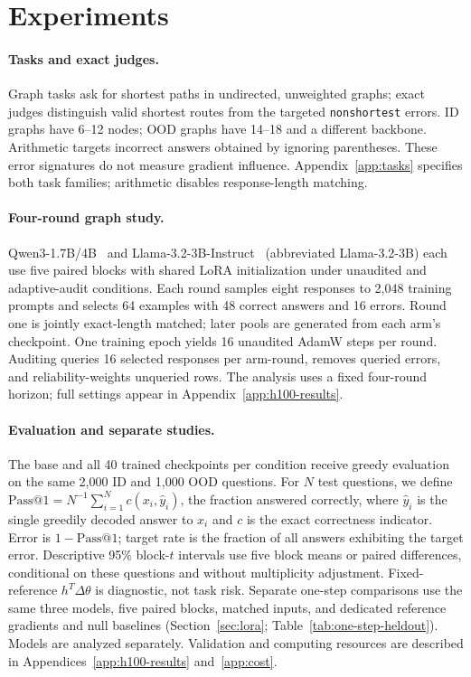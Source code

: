 \section{Experiments}
\label{sec:experiments}

\paragraph{Tasks and exact judges.}
\label{sec:tasks}
Graph tasks ask for shortest paths in undirected, unweighted graphs;
exact judges distinguish valid shortest routes from the targeted
\texttt{nonshortest} errors. ID graphs have 6--12 nodes; OOD graphs have
14--18 and a different backbone. Arithmetic targets incorrect answers
obtained by ignoring parentheses. These error signatures do not measure
gradient influence. Appendix~\ref{app:tasks} specifies both task families;
arithmetic disables response-length matching.

\paragraph{Four-round graph study.}
Qwen3-1.7B/4B~\citep{qwen3} and Llama-3.2-3B-Instruct~\citep{llama3,llama32}
(abbreviated Llama-3.2-3B) each use five paired blocks with shared
LoRA initialization under unaudited and adaptive-audit conditions.
Each round samples eight responses to 2,048 training prompts and selects
64 examples with 48 correct answers and 16 errors. Round one is jointly
exact-length matched; later pools are generated from each arm's checkpoint.
One training epoch yields 16 unaudited AdamW steps per round. Auditing
queries 16 selected responses per arm-round, removes queried errors, and
reliability-weights unqueried rows. The analysis uses a fixed four-round
horizon; full settings appear in Appendix~\ref{app:h100-results}.


\paragraph{Evaluation and separate studies.}
The base and all 40 trained checkpoints per condition receive greedy
evaluation on the same 2,000 ID and 1,000 OOD questions.
For $N$ test questions, we define
$\mathrm{Pass@1}=N^{-1}\sum_{i=1}^{N}c(x_i,\hat y_i)$,
the fraction answered correctly, where $\hat y_i$ is the single greedily
decoded answer to $x_i$ and $c$ is the exact correctness indicator. Error is
$1-\mathrm{Pass@1}$; target rate is the fraction of all answers exhibiting
the target error. Descriptive 95\% block-$t$ intervals use five block means
or paired differences, conditional on these questions and without
multiplicity adjustment. Fixed-reference $h^T\Delta\theta$ is diagnostic,
not task risk. Separate one-step comparisons use the same three models,
five paired blocks, matched inputs, and dedicated reference gradients and
null baselines (Section~\ref{sec:lora}; Table~\ref{tab:one-step-heldout}).
Models are analyzed separately. Validation and computing resources are
described in Appendices~\ref{app:h100-results} and~\ref{app:cost}.
